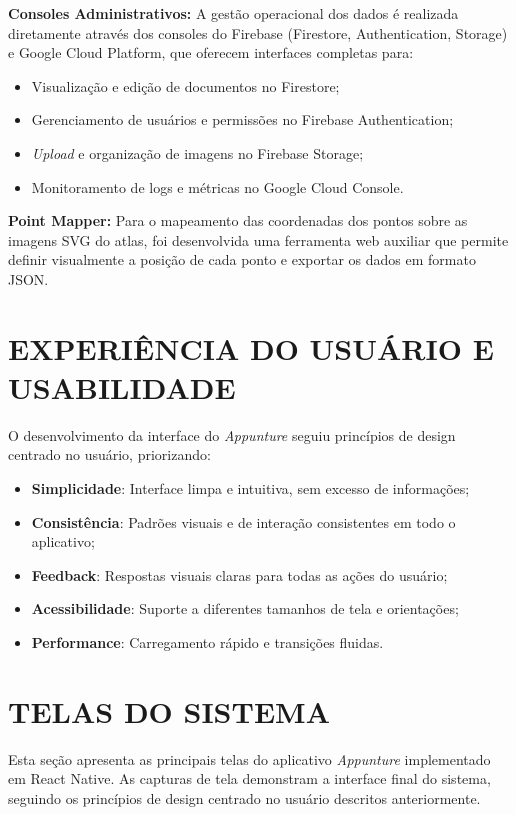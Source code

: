 \textbf{Consoles Administrativos:} A gestão operacional dos dados é realizada diretamente através dos consoles do Firebase (Firestore, Authentication, Storage) e Google Cloud Platform, que oferecem interfaces completas para:

\begin{itemize}
    \item Visualização e edição de documentos no Firestore;
    \item Gerenciamento de usuários e permissões no Firebase Authentication;
    \item \textit{Upload} e organização de imagens no Firebase Storage;
    \item Monitoramento de logs e métricas no Google Cloud Console.
\end{itemize}

\textbf{Point Mapper:} Para o mapeamento das coordenadas dos pontos sobre as imagens SVG do atlas, foi desenvolvida uma ferramenta web auxiliar que permite definir visualmente a posição de cada ponto e exportar os dados em formato JSON.
\section{EXPERIÊNCIA DO USUÁRIO E USABILIDADE} \label{sec:ux}

O desenvolvimento da interface do \textit{Appunture} seguiu princípios de design centrado no usuário, priorizando:

\begin{itemize}
    \item \textbf{Simplicidade}: Interface limpa e intuitiva, sem excesso de informações;
    \item \textbf{Consistência}: Padrões visuais e de interação consistentes em todo o aplicativo;
    \item \textbf{Feedback}: Respostas visuais claras para todas as ações do usuário;
    \item \textbf{Acessibilidade}: Suporte a diferentes tamanhos de tela e orientações;
    \item \textbf{Performance}: Carregamento rápido e transições fluidas.
\end{itemize}

\section{TELAS DO SISTEMA} \label{sec:telas}

Esta seção apresenta as principais telas do aplicativo \textit{Appunture} implementado em React Native. As capturas de tela demonstram a interface final do sistema, seguindo os princípios de design centrado no usuário descritos anteriormente.

